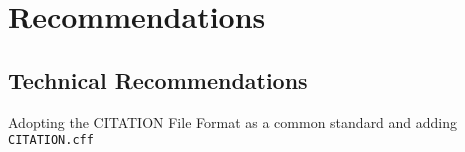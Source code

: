 \section{Recommendations}\label{sec:recommendations}

\subsection{Technical Recommendations}\label{sec:recommendations_technical}

Adopting the CITATION File Format as a common standard and adding \texttt{CITATION.cff}

